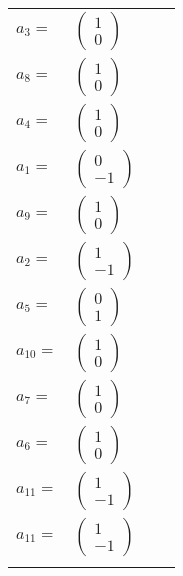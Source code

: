 \documentclass[1p]{elsarticle_modified}
\theoremstyle{definition}
\begin{document}
\begin{tabular}{m{7pt} m{180pt} m{7pt} m{180pt} }
\flushright $a_{3}=$&$\begin{pmatrix}1\\0\end{pmatrix}$ \\
\flushright $a_{8}=$&$\begin{pmatrix}1\\0\end{pmatrix}$ \\
\flushright $a_{4}=$&$\begin{pmatrix}1\\0\end{pmatrix}$ \\
\flushright $a_{1}=$&$\begin{pmatrix}0\\-1\end{pmatrix}$ \\
\flushright $a_{9}=$&$\begin{pmatrix}1\\0\end{pmatrix}$ \\
\flushright $a_{2}=$&$\begin{pmatrix}1\\-1\end{pmatrix}$ \\
\flushright $a_{5}=$&$\begin{pmatrix}0\\1\end{pmatrix}$ \\
\flushright $a_{10}=$&$\begin{pmatrix}1\\0\end{pmatrix}$ \\
\flushright $a_{7}=$&$\begin{pmatrix}1\\0\end{pmatrix}$ \\
\flushright $a_{6}=$&$\begin{pmatrix}1\\0\end{pmatrix}$ \\
\flushright $a_{11}=$&$\begin{pmatrix}1\\-1\end{pmatrix}$\\ \flushright $a_{11}=$&$\begin{pmatrix}1\\-1\end{pmatrix}$\\&\end{tabular}
\end{document}
